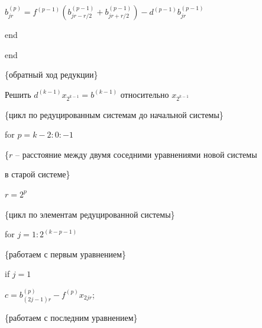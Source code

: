 {\hspace{.5cm} \hspace{.5cm} $b_{jr}^{(p)}=f^{(p-1)}(b_{jr-r/2}^{(p-1)}+b_{jr+r/2}^{(p-1)})-d^{(p-1)}b_{jr}^{(p-1)}$



\hspace{.5cm} end



end



\{обратный ход редукции\}



Решить $d^{(k-1)}x_{2^{k-1}}=b^{(k-1)}$ относительно $x_{2^{k-1}}$



\{цикл по редуцированным системам до начальной системы\}



for $p=k-2:0:-1$



\{$r$ -- расстояние между двумя соседними уравнениями новой системы 



 в старой системе\} 

 

$r=2^p$



\{цикл по элементам редуцированной системы\}



\hspace{.5cm}

for $j=1:2^{(k-p-1)}$



\hspace{.5cm}

\{работаем с первым уравнением\}



\hspace{.5cm} \hspace{.5cm}

if $j=1$



\hspace{.5cm} \hspace{.5cm} \hspace{.5cm}

$ c=b^{(p)}_{(2j-1)r}-f^{(p)}x_{2jr}$;



\hspace{.5cm}

\{работаем с последним уравнением\}



}
